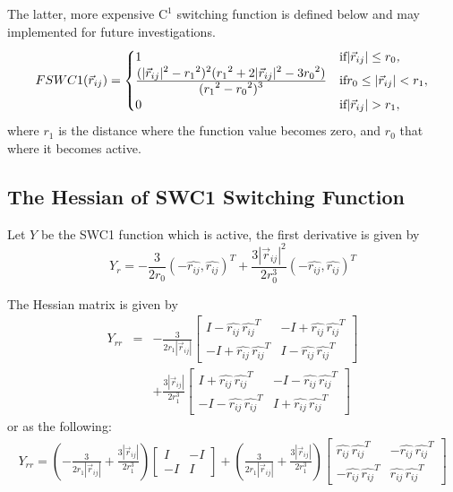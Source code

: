 \documentclass[11pt]{article}
\newcommand{\hatr}[1]{\mbox{$\hat{{r}_{#1}}$}}
\newcommand{\AbsVr}[1]{\mbox{$\left| \vec{r}_{#1} \right| $}}
\begin{document}
The latter, more expensive $\mathrm{C}^{1}$ switching function is defined below and may
implemented for future investigations.
\begin{equation}
FSWC1(\vec{r}_{ij})= \begin{cases}
1 & \mbox{if}  |\vec{r}_{ij}|\leq{r_0}\emph{,}\\
\frac{\displaystyle (|\vec{r}_{ij}|^{2} - {r_1}^{2})^{2}({r_1}^{2}+2|\vec{r}_{ij}|
^{2}-3{r_0}^{2})}{\displaystyle ({r_1}^{2}-{r_0}^{2})^{3}} & \mbox{if}
{r_0}\leq|\vec{r}_{ij}|<{r_1}{,}\\
0 & \mbox{if}  |\vec{r}_{ij}|>{r_1}{,}
\end{cases}
\end{equation}
where ${r_1}$ is the distance where the function value becomes zero,
and ${r_0}$ that where it becomes active.

\subsection{The Hessian of SWC1 Switching Function}
Let $Y$ be the SWC1 function which is active, the first derivative is
given by
\begin{equation}
Y_r = -\frac{3}{2 r_0} (-\hatr{ij},\hatr{ij})^T + \frac{3 \AbsVr{ij}^2}{2 r_0^3} (-\hatr{ij},\hatr{ij})^T 
\end{equation}

The Hessian matrix is given by
\begin{eqnarray}
Y_{rr}&=&  -\frac{3}{2 r_1 \AbsVr{ij}}
\left[\begin{array}{cc}
I-\hatr{ij}\,\hatr{ij}^T & -I+\hatr{ij}\,\hatr{ij}^T \\
-I+\hatr{ij} \,\hatr{ij}^T & I-\hatr{ij}\,\hatr{ij}^T
\end{array}\right] \nonumber \\
& &  + \frac{3 \AbsVr{ij}}{2 r_1^3} 
\left[\begin{array}{cc}
I + \hatr{ij}\,\hatr{ij}^T & -I -\hatr{ij}\,\hatr{ij}^T \\
-I-\hatr{ij} \,\hatr{ij}^T & I+\hatr{ij}\,\hatr{ij}^T
\end{array}\right]
\end{eqnarray}
or as the following:
\begin{eqnarray}
Y_{rr}= (-\frac{3}{2 r_1 \AbsVr{ij}} + \frac{3 \AbsVr{ij}}{2 r_1^3})
\left[
\begin{array}{cc}
 I & -I\\
-I &  I
\end{array}\right]
 + (\frac{3}{2 r_1 \AbsVr{ij}} + \frac{3 \AbsVr{ij}}{2 r_1^3})
\left[\begin{array}{cc}
\hatr{ij}\,\hatr{ij}^T & -\hatr{ij}\,\hatr{ij}^T \\
-\hatr{ij} \,\hatr{ij}^T & \hatr{ij}\,\hatr{ij}^T
\end{array}\right]
\end{eqnarray}
\end{document}

